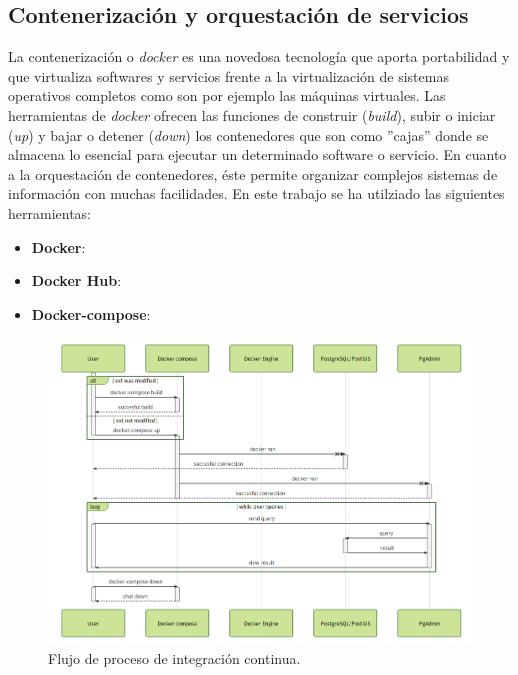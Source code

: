 \subsection{Contenerización y orquestación de servicios}\label{subsec:conten-orquest}

La contenerización o \textit{docker} es una novedosa tecnología que aporta portabilidad y que virtualiza softwares y servicios frente a la virtualización de sistemas operativos completos como son por ejemplo las máquinas virtuales. Las herramientas de \textit{docker} ofrecen las funciones de construir (\textit{build}), subir o iniciar (\textit{up}) y bajar o detener (\textit{down}) los contenedores que son como ''cajas'' donde se almacena lo esencial para ejecutar un determinado software o servicio. En cuanto a la orquestación de contenedores, éste permite organizar complejos sistemas de información con muchas facilidades. En este trabajo se ha utilziado las siguientes herramientas:

\begin{itemize}
\item\textbf{Docker}: 
\item\textbf{Docker Hub}: 
\item\textbf{Docker-compose}: 
\end{itemize}

\begin{figure}
\begin{center}
\includegraphics[width=\textwidth]{Metodologia/Figs/ci.png}
\caption{Flujo de proceso de integración continua. \label{fig:ci}}
\end{center}
\end{figure}



